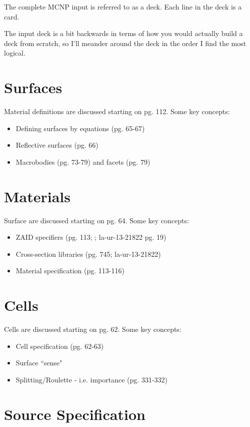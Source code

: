 \documentclass[12pt]{article}
\begin{document}
The complete MCNP input is referred to as a deck.
Each line in the deck is a card.

The input deck is a bit backwards in terms of how you would actually build a deck from scratch, so I'll meander around the deck in the order I find the most logical.

\section*{Surfaces}

Material definitions are discussed starting on pg. 112.
Some key concepts:

\begin{itemize}
  \item Defining surfaces by equations (pg. 65-67)
  \item Reflective surfaces (pg. 66)
  \item Macrobodies (pg. 73-79) and facets (pg. 79)
\end{itemize}

\section*{Materials}

Surface are discussed starting on pg. 64.
Some key concepts:

\begin{itemize}
  \item ZAID specifiers (pg. 113; ; la-ur-13-21822 pg. 19)
  \item Cross-section libraries (pg. 745; la-ur-13-21822)
  \item Material specification (pg. 113-116)
\end{itemize}

\section*{Cells}

Cells are discussed starting on pg. 62.
Some key concepts:

\begin{itemize}
  \item Cell specification (pg. 62-63)
  \item Surface ``sense"
  \item Splitting/Roulette - i.e. importance (pg. 331-332)
\end{itemize}

\section*{Source Specification}
\end{document}
